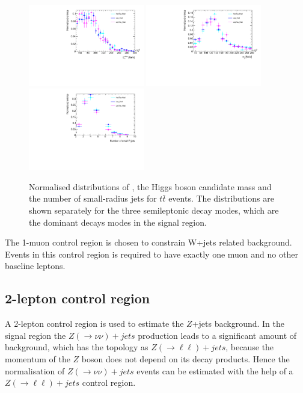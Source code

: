 \begin{figure}[h]
    \centering
	\includegraphics[width=0.45\textwidth]{chapters/c7/figures/ttbar_MetTST_met.pdf}
	\includegraphics[width=0.45\textwidth]{chapters/c7/figures/ttbar_m_jj.pdf}
	\includegraphics[width=0.45\textwidth]{chapters/c7/figures/ttbar_N_Jets04.pdf}		
	\caption{Normalised distributions of \met, the Higgs boson candidate mass and the number of small-radius jets for $t\bar{t}$ events. The distributions are shown separately for the three semileptonic decay modes, which are the dominant decays modes in the signal region.}
	\label{fig:ttbarDecayCatKinematic}
\end{figure}

\par The 1-muon control region is chosen to constrain W+jets related background. Events in this control region is required to have exactly one muon and no other baseline leptons.

\subsection{2-lepton control region}
\par A 2-lepton control region is used to estimate the $Z$+jets background. 
In the signal region the $Z(\to\nu\nu)+jets$ production leads to a significant amount of background, which has the topology as $Z(\to\ell\ell)+jets$, because the momentum of the $Z$ boson does not depend on its decay products. 
Hence the normalisation of $Z(\to\nu\nu)+jets$ events can be estimated with the help of a $Z(\to\ell\ell)+jets$ control region.

